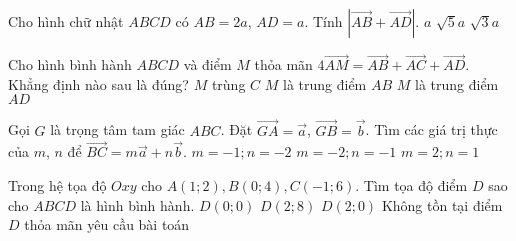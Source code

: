 \begin{ex}%
	Cho hình chữ nhật $ABCD$ có $AB=2a$, $AD=a$. Tính $\left|\vec{AB} +\vec{AD}\right|$.
	{$a$}
	{\True $\sqrt{5}a$}
	{$\sqrt{3}a$}
\end{ex}
\begin{ex}%
	Cho hình bình hành $ABCD$ và điểm $M$ thỏa mãn $ 4\vec{AM}= \vec{AB}+ \vec{AC}+\vec{AD}$. Khẳng định nào sau là đúng?
	{$M$ trùng $C$}
	{$M$ là trung điểm $AB$}
	{$M$ là trung điểm $AD$}
\end{ex}
\begin{ex}%
	Gọi $G$ là trọng tâm tam giác $ABC$. Đặt $ \vec{GA}=\vec{a}$, $ \vec{GB}= \vec{b}$. Tìm các giá trị thực của $m$, $n$ để $ \vec{BC}= m\vec{a}+ n\vec{b}$.
	{\True $m=-1; n= -2 $}
	{$m= -2; n=-1 $}
	{$m=2; n=1 $}
\end{ex}%
\begin{ex} 
	Trong hệ tọa độ $Oxy$ cho $A(1;2), B(0;4), C(-1;6)$. Tìm tọa độ điểm $D$ sao cho $ABCD$ là hình bình hành.
	\choice
	{$D(0;0)$}
	{$D(2;8)$}
	{$D(2;0)$}
	{\True Không tồn tại điểm $D$ thỏa mãn yêu cầu bài toán}
\end{ex}

